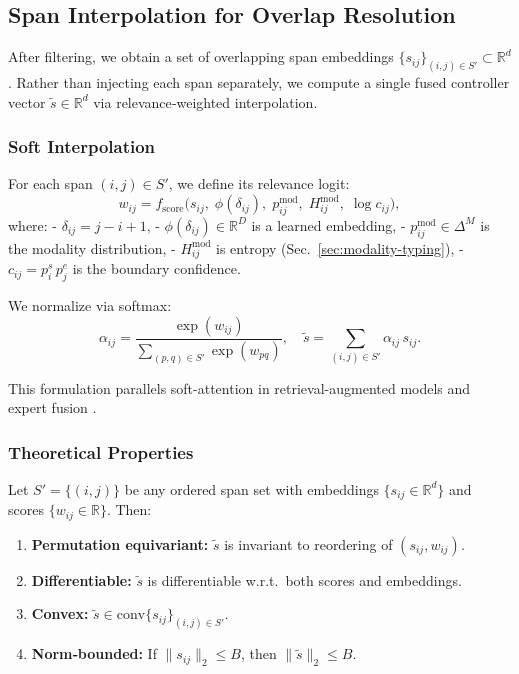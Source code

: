 \subsection{Span Interpolation for Overlap Resolution}
\label{sec:span-interpolation}

After filtering, we obtain a set of overlapping span embeddings \(\{s_{ij}\}_{(i,j)\in S'}\subset\mathbb{R}^d\). Rather than injecting each span separately, we compute a single fused controller vector \(\tilde{s}\in\mathbb{R}^d\) via relevance‐weighted interpolation.

\subsubsection{Soft Interpolation}

For each span \((i,j)\in S'\), we define its relevance logit:
\begin{equation}
	w_{ij} = f_{\mathrm{score}}\bigl(
	s_{ij},\;
	\phi(\delta_{ij}),\;
	p^{\mathrm{mod}}_{ij},\;
	H^{\mathrm{mod}}_{ij},\;
	\log c_{ij}
	\bigr),
	\label{eq:relevance_score}
\end{equation}
where:
- \(\delta_{ij} = j - i + 1\),
- \(\phi(\delta_{ij})\in\mathbb{R}^D\) is a learned embedding,
- \(p^{\mathrm{mod}}_{ij}\in\Delta^M\) is the modality distribution,
- \(H^{\mathrm{mod}}_{ij}\) is entropy (Sec.~\ref{sec:modality-typing}),
- \(c_{ij} = p^s_i\,p^e_j\) is the boundary confidence.

We normalize via softmax:
\begin{equation}
	\alpha_{ij} = \frac{\exp(w_{ij})}{\sum_{(p,q)\in S'}\exp(w_{pq})},
	\quad
	\tilde{s} = \sum_{(i,j)\in S'} \alpha_{ij}\,s_{ij}.
	\label{eq:span_interp}
\end{equation}

This formulation parallels soft-attention in retrieval-augmented models \cite{guu2020retrieval,izacard2020distilling} and expert fusion \cite{arora2022exsum}.

\subsubsection{Theoretical Properties}

\begin{proposition}
	Let \(S' = \{(i,j)\}\) be any ordered span set with embeddings \(\{s_{ij}\in\mathbb{R}^d\}\) and scores \(\{w_{ij}\in\mathbb{R}\}\). Then:
	\begin{enumerate}
		\item \textbf{Permutation equivariant:}
		\(\tilde{s}\) is invariant to reordering of \((s_{ij}, w_{ij})\).
		\item \textbf{Differentiable:}
		\(\tilde{s}\) is differentiable w.r.t.\ both scores and embeddings.
		\item \textbf{Convex:}
		\(\tilde{s} \in \mathrm{conv}\{s_{ij}\}_{(i,j)\in S'}\).
		\item \textbf{Norm‐bounded:}
		If \(\|s_{ij}\|_2 \le B\), then \(\|\tilde{s}\|_2 \le B\).
	\end{enumerate}
\end{proposition}

